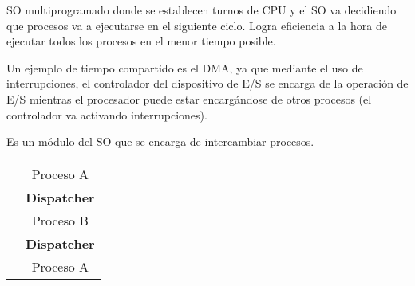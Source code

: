 \begin{definicion}
    SO multiprogramado donde se establecen turnos de CPU y el SO va decidiendo que procesos va a ejecutarse en el siguiente ciclo. Logra eficiencia a la hora de ejecutar todos los procesos en el menor tiempo posible.
    
    Un ejemplo de tiempo compartido es el DMA, ya que mediante el uso de interrupciones, el controlador del dispositivo de E/S se encarga de la operación de E/S mientras el procesador puede estar encargándose de otros procesos (el controlador va activando interrupciones).
\end{definicion}

\begin{definicion} [Dispatcher]
    Es un módulo del SO que se encarga de intercambiar procesos.
    \begin{table}[H]
        \centering
        \begin{tabular}{|c|c}
        \cline{1-1}
         \hspace{2cm} & Proceso A            \\ \cline{1-1}
         \hspace{2cm} & \textbf{Dispatcher}  \\ \cline{1-1}
         \hspace{2cm} & Proceso B            \\ \cline{1-1}
         \hspace{2cm} & \textbf{Dispatcher}  \\ \cline{1-1}
         \hspace{2cm} & Proceso A            \\ \cline{1-1}
        \end{tabular}
    \end{table}
\end{definicion}

